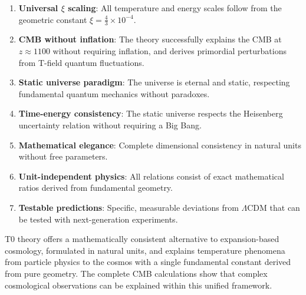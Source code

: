 	\begin{enumerate}
		\item \textbf{Universal $\xi$ scaling}: All temperature and energy scales follow from the geometric constant $\xi = \frac{4}{3} \times 10^{-4}$.
		
		\item \textbf{CMB without inflation}: The theory successfully explains the CMB at $z \approx 1100$ without requiring inflation, and derives primordial perturbations from T-field quantum fluctuations.
		
		\item \textbf{Static universe paradigm}: The universe is eternal and static, respecting fundamental quantum mechanics without paradoxes.
		
		\item \textbf{Time-energy consistency}: The static universe respects the Heisenberg uncertainty relation without requiring a Big Bang.
		
		\item \textbf{Mathematical elegance}: Complete dimensional consistency in natural units without free parameters.
		
		\item \textbf{Unit-independent physics}: All relations consist of exact mathematical ratios derived from fundamental geometry.
		
		\item \textbf{Testable predictions}: Specific, measurable deviations from $\Lambda$CDM that can be tested with next-generation experiments.
	\end{enumerate}
	
	\begin{revolutionary}
		T0 theory offers a mathematically consistent alternative to expansion-based cosmology, formulated in natural units, and explains temperature phenomena from particle physics to the cosmos with a single fundamental constant derived from pure geometry. The complete CMB calculations show that complex cosmological observations can be explained within this unified framework.
	\end{revolutionary}
	

